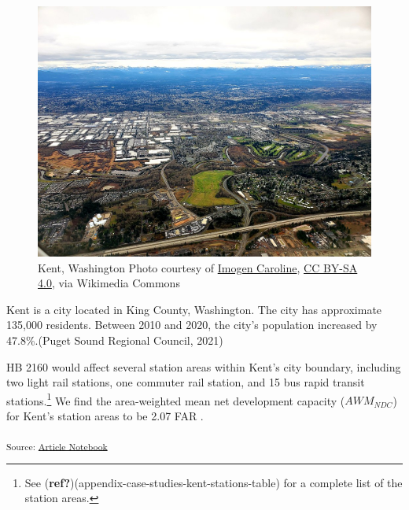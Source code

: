 \documentclass[
]{agujournal2019}
\begin{document}
\begin{figure}[H]

{\centering \includegraphics{images/kent-aerial.jpg}

}

\caption{Kent, Washington \textbar{} Photo courtesy of
\href{https://commons.wikimedia.org/wiki/File:Kent_Washington_Above.jpg}{Imogen
Caroline}, \href{https://creativecommons.org/licenses/by-sa/4.0}{CC
BY-SA 4.0}, via Wikimedia Commons}

\end{figure}%

Kent is a city located in King County, Washington. The city has
approximate 135,000 residents. Between 2010 and 2020, the city's
population increased by 47.8\%.(Puget Sound Regional Council, 2021)

HB 2160 would affect several station areas within Kent's city boundary,
including two light rail stations, one commuter rail station, and 15 bus
rapid transit stations.\footnote{See
  (\textbf{ref?})(appendix-case-studies-kent-stations-table) for a
  complete list of the station areas.} We find the area-weighted mean
net development capacity (\(AWM_{NDC}\)) for Kent's station areas to be
2.07 FAR .

\textsubscript{Source:
\href{https://tiernanmartin.github.io/2024-transit-oriented-development-bill/index.qmd.html}{Article
Notebook}}
\end{document}
